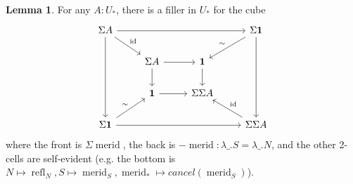\documentclass{amsart}
\theoremstyle{definition}
\newtheorem{lem}[theorem]{Lemma}
\newcommand{\id}{\operatorname{id}}
\newcommand{\refl}{\operatorname{refl}}
\newcommand{\merid}{\operatorname{merid}}
\newcommand{\sgtn}{\mathbf{1}}
\begin{document}
\begin{lem}\label{le:susp-of-merid}
    For any $A: U_*$, there is a filler in $U_*$ for the cube
    \[\begin{tikzcd}
    	{\Sigma A} &&& {\Sigma \sgtn} \\
    	& {\Sigma A} & \sgtn \\
    	& \sgtn & {\Sigma \Sigma A} \\
    	{\Sigma \sgtn} &&& {\Sigma \Sigma A}
    	\arrow[from=1-1, to=1-4]
    	\arrow["\id", from=1-1, to=2-2]
    	\arrow[from=1-1, to=4-1]
    	\arrow["\sim"', from=1-4, to=2-3]
    	\arrow[from=1-4, to=4-4]
    	\arrow[from=2-2, to=2-3]
    	\arrow[from=2-2, to=3-2]
    	\arrow[from=2-3, to=3-3]
    	\arrow[from=3-2, to=3-3]
    	\arrow["\sim", from=4-1, to=3-2]
    	\arrow[from=4-1, to=4-4]
    	\arrow["\id"', from=4-4, to=3-3]
    \end{tikzcd}\]
    where the front is $\Sigma \merid$, the back is $-\merid: \lambda \_.S = \lambda \_ .N$, and the other 2-cells are self-evident (e.g. the bottom is $N \mapsto \refl_N, S \mapsto \merid_S, \merid_{*} \mapsto cancel(\merid_S)$).
\end{lem}
\end{document}
